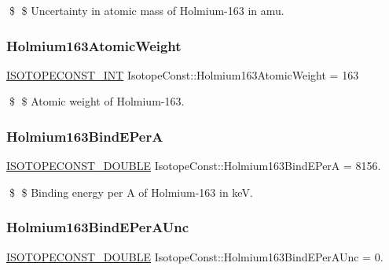 \$ \$ Uncertainty in atomic mass of Holmium-\/163 in amu. \mbox{\label{group___isotope_const-_holmium-_ho163_ga4e852a5939168c740ebbea155d9e8799}} 
\subsubsection{\texorpdfstring{Holmium163\+Atomic\+Weight}{Holmium163AtomicWeight}}
{\footnotesize\ttfamily \mbox{\hyperlink{group___isotope_const-_macros_ga5f18360b3e99483a35c32d789e62621c}{I\+S\+O\+T\+O\+P\+E\+C\+O\+N\+S\+T\+\_\+\+I\+NT}} Isotope\+Const\+::\+Holmium163\+Atomic\+Weight = 163}

\$ \$ Atomic weight of Holmium-\/163. \mbox{\label{group___isotope_const-_holmium-_ho163_ga9c9a43bd84ea049237ea632d722aad0b}} 
\subsubsection{\texorpdfstring{Holmium163\+Bind\+E\+PerA}{Holmium163BindEPerA}}
{\footnotesize\ttfamily \mbox{\hyperlink{group___isotope_const-_macros_ga8f45a7272ce02c0b4c65c44636ed719a}{I\+S\+O\+T\+O\+P\+E\+C\+O\+N\+S\+T\+\_\+\+D\+O\+U\+B\+LE}} Isotope\+Const\+::\+Holmium163\+Bind\+E\+PerA = 8156.}

\$ \$ Binding energy per A of Holmium-\/163 in keV. \mbox{\label{group___isotope_const-_holmium-_ho163_gad997edc12085562422362192a3ecd8f2}} 
\subsubsection{\texorpdfstring{Holmium163\+Bind\+E\+Per\+A\+Unc}{Holmium163BindEPerAUnc}}
{\footnotesize\ttfamily \mbox{\hyperlink{group___isotope_const-_macros_ga8f45a7272ce02c0b4c65c44636ed719a}{I\+S\+O\+T\+O\+P\+E\+C\+O\+N\+S\+T\+\_\+\+D\+O\+U\+B\+LE}} Isotope\+Const\+::\+Holmium163\+Bind\+E\+Per\+A\+Unc = 0.}

